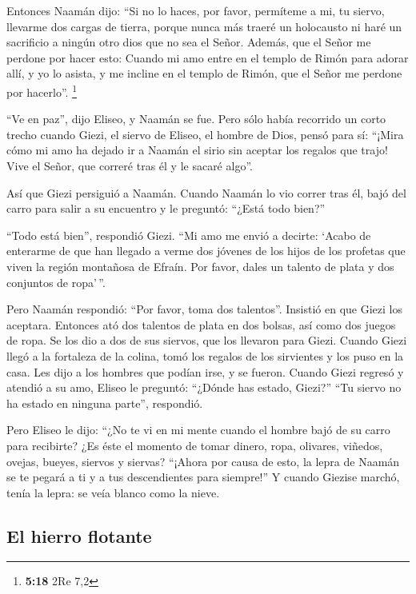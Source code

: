  Entonces Naamán dijo: ``Si no lo haces, por favor,
permíteme a mi, tu siervo, llevarme dos cargas de tierra, porque nunca
más traeré un holocausto ni haré un sacrificio a ningún otro dios que no
sea el Señor.  Además, que el Señor me perdone por hacer
esto: Cuando mi amo entre en el templo de Rimón para adorar allí, y yo
lo asista, y me incline en el templo de Rimón, que el Señor me perdone
por hacerlo''. \footnote{\textbf{5:18} 2Re 7,2}

 ``Ve en paz'', dijo Eliseo, y Naamán se fue. Pero sólo
había recorrido un corto trecho  cuando Giezi, el siervo
de Eliseo, el hombre de Dios, pensó para sí: ``¡Mira cómo mi amo ha
dejado ir a Naamán el sirio sin aceptar los regalos que trajo! Vive el
Señor, que correré tras él y le sacaré algo''.

 Así que Giezi persiguió a Naamán. Cuando Naamán lo vio
correr tras él, bajó del carro para salir a su encuentro y le preguntó:
``¿Está todo bien?''

 ``Todo está bien'', respondió Giezi. ``Mi amo me envió a
decirte: `Acabo de enterarme de que han llegado a verme dos jóvenes de
los hijos de los profetas que viven la región montañosa de Efraín. Por
favor, dales un talento de plata y dos conjuntos de ropa'\,''.

 Pero Naamán respondió: ``Por favor, toma dos talentos''.
Insistió en que Giezi los aceptara. Entonces ató dos talentos de plata
en dos bolsas, así como dos juegos de ropa. Se los dio a dos de sus
siervos, que los llevaron para Giezi.  Cuando Giezi llegó
a la fortaleza de la colina, tomó los regalos de los sirvientes y los
puso en la casa. Les dijo a los hombres que podían irse, y se fueron.
 Cuando Giezi regresó y atendió a su amo, Eliseo le
preguntó: ``¿Dónde has estado, Giezi?'' ``Tu siervo no ha estado en
ninguna parte'', respondió.

 Pero Eliseo le dijo: ``¿No te vi en mi mente cuando el
hombre bajó de su carro para recibirte? ¿Es éste el momento de tomar
dinero, ropa, olivares, viñedos, ovejas, bueyes, siervos y siervas?
 ``¡Ahora por causa de esto, la lepra de Naamán se te
pegará a ti y a tus descendientes para siempre!'' Y cuando Giezise
marchó, tenía la lepra: se veía blanco como la nieve.

\hypertarget{el-hierro-flotante}{%
\subsection{El hierro flotante}\label{el-hierro-flotante}}

